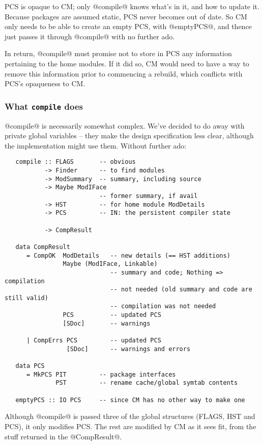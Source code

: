 \documentclass[11pt]{article}
\begin{document}
   PCS is opaque to CM; only @compile@ knows what's in it, and how to
   update it.  Because packages are assumed static, PCS never becomes
   out of date.  So CM only needs to be able to create an empty PCS,
   with @emptyPCS@, and thence just passes it through @compile@ with
   no further ado.

   In return, @compile@ must promise not to store in PCS any
   information pertaining to the home modules.  If it did so, CM would
   need to have a way to remove this information prior to commencing a
   rebuild, which conflicts with PCS's opaqueness to CM.




\subsubsection{What {\tt compile} does}
@compile@ is necessarily somewhat complex.  We've decided to do away
with private global variables -- they make the design specification
less clear, although the implementation might use them.  Without
further ado:
\begin{verbatim}
   compile :: FLAGS       -- obvious
           -> Finder      -- to find modules
           -> ModSummary  -- summary, including source
           -> Maybe ModIFace
                          -- former summary, if avail
           -> HST         -- for home module ModDetails
           -> PCS         -- IN: the persistent compiler state

           -> CompResult

   data CompResult
      = CompOK  ModDetails   -- new details (== HST additions)
                Maybe (ModIFace, Linkable)
                             -- summary and code; Nothing => compilation
                             -- not needed (old summary and code are still valid)
                             -- compilation was not needed
                PCS          -- updated PCS
                [SDoc]       -- warnings

      | CompErrs PCS         -- updated PCS
                 [SDoc]      -- warnings and errors

   data PCS
      = MkPCS PIT         -- package interfaces
              PST         -- rename cache/global symtab contents

   emptyPCS :: IO PCS     -- since CM has no other way to make one
\end{verbatim}
Although @compile@ is passed three of the global structures (FLAGS,
HST and PCS), it only modifies PCS.  The rest are modified by CM as it
sees fit, from the stuff returned in the @CompResult@.
\end{document}
